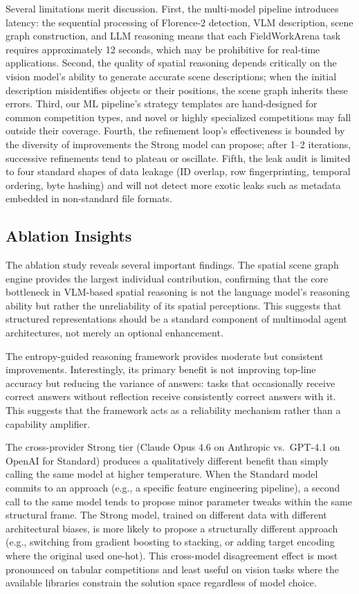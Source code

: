 \documentclass[11pt]{article}
\begin{document}
Several limitations merit discussion. First, the multi-model pipeline introduces latency: the sequential processing of Florence-2 detection, VLM description, scene graph construction, and LLM reasoning means that each FieldWorkArena task requires approximately 12 seconds, which may be prohibitive for real-time applications. Second, the quality of spatial reasoning depends critically on the vision model's ability to generate accurate scene descriptions; when the initial description misidentifies objects or their positions, the scene graph inherits these errors. Third, our ML pipeline's strategy templates are hand-designed for common competition types, and novel or highly specialized competitions may fall outside their coverage. Fourth, the refinement loop's effectiveness is bounded by the diversity of improvements the Strong model can propose; after 1--2 iterations, successive refinements tend to plateau or oscillate. Fifth, the leak audit is limited to four standard shapes of data leakage (ID overlap, row fingerprinting, temporal ordering, byte hashing) and will not detect more exotic leaks such as metadata embedded in non-standard file formats.

\subsection{Ablation Insights}

The ablation study reveals several important findings. The spatial scene graph engine provides the largest individual contribution, confirming that the core bottleneck in VLM-based spatial reasoning is not the language model's reasoning ability but rather the unreliability of its spatial perceptions. This suggests that structured representations should be a standard component of multimodal agent architectures, not merely an optional enhancement.

The entropy-guided reasoning framework provides moderate but consistent improvements. Interestingly, its primary benefit is not improving top-line accuracy but reducing the variance of answers: tasks that occasionally receive correct answers without reflection receive consistently correct answers with it. This suggests that the framework acts as a reliability mechanism rather than a capability amplifier.

The cross-provider Strong tier (Claude Opus 4.6 on Anthropic vs.\ GPT-4.1 on OpenAI for Standard) produces a qualitatively different benefit than simply calling the same model at higher temperature. When the Standard model commits to an approach (e.g., a specific feature engineering pipeline), a second call to the same model tends to propose minor parameter tweaks within the same structural frame. The Strong model, trained on different data with different architectural biases, is more likely to propose a structurally different approach (e.g., switching from gradient boosting to stacking, or adding target encoding where the original used one-hot). This cross-model disagreement effect is most pronounced on tabular competitions and least useful on vision tasks where the available libraries constrain the solution space regardless of model choice.
\end{document}
